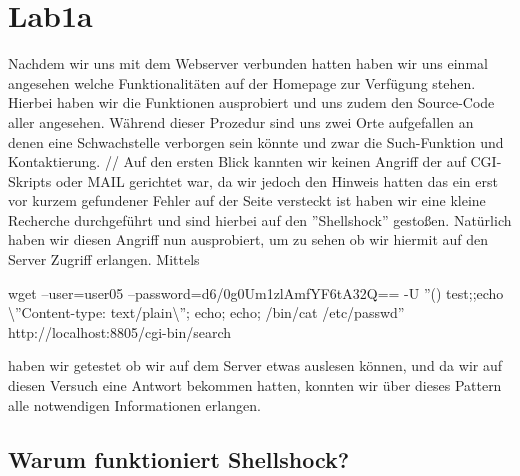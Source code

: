 \documentclass[12pt,a4paper,titlepage,oneside]{scrartcl}
\begin{document}
\maketitle
\setcounter{section}{0}
\setcounter{tocdepth}{2}
\tableofcontents

%
%

\section{Lab1a}

Nachdem wir uns mit dem Webserver verbunden hatten haben wir uns einmal angesehen welche Funktionalitäten auf der Homepage zur Verfügung stehen. Hierbei haben wir die Funktionen ausprobiert und uns zudem den Source-Code aller angesehen. Während dieser Prozedur sind uns zwei Orte aufgefallen an denen eine Schwachstelle verborgen sein könnte und zwar die Such-Funktion und Kontaktierung. //
Auf den ersten Blick kannten wir keinen Angriff der auf CGI-Skripts oder MAIL gerichtet war, da wir jedoch den Hinweis hatten das ein erst vor kurzem gefundener Fehler auf der Seite versteckt ist haben wir eine kleine Recherche durchgeführt und sind hierbei auf den ''Shellshock'' gestoßen. Natürlich haben wir diesen Angriff nun ausprobiert, um zu sehen ob wir hiermit auf den Server Zugriff erlangen. Mittels 
\begin{center}
wget --user=user05 --password=d6/0g0Um1zlAmfYF6tA32Q== -U ''() { test;};echo \textbackslash''Content-type: text/plain\textbackslash''; echo; echo; /bin/cat /etc/passwd'' http://localhost:8805/cgi-bin/search
\end{center}
haben wir getestet ob wir auf dem Server etwas auslesen können, und da wir auf diesen Versuch eine Antwort bekommen hatten, konnten wir über dieses Pattern alle notwendigen Informationen erlangen. 

\subsection{Warum funktioniert Shellshock?}
\end{document}
